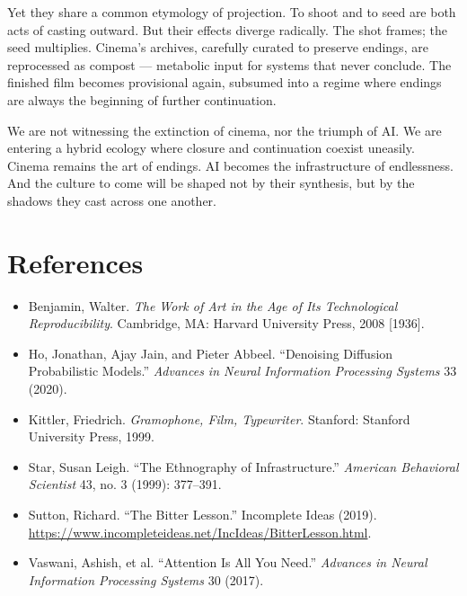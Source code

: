 \documentclass[11pt]{article}
\begin{document}
Yet they share a common etymology of projection. To shoot and to seed are both acts of casting outward. But their effects diverge radically. The shot frames; the seed multiplies. Cinema's archives, carefully curated to preserve endings, are reprocessed as compost --- metabolic input for systems that never conclude. The finished film becomes provisional again, subsumed into a regime where endings are always the beginning of further continuation.

We are not witnessing the extinction of cinema, nor the triumph of AI. We are entering a hybrid ecology where closure and continuation coexist uneasily. Cinema remains the art of endings. AI becomes the infrastructure of endlessness. And the culture to come will be shaped not by their synthesis, but by the shadows they cast across one another.

\vspace{1em}
\section*{References}
\begin{itemize}
  \item Benjamin, Walter. \textit{The Work of Art in the Age of Its Technological Reproducibility}. Cambridge, MA: Harvard University Press, 2008 [1936].
  \item Ho, Jonathan, Ajay Jain, and Pieter Abbeel. ``Denoising Diffusion Probabilistic Models.'' \textit{Advances in Neural Information Processing Systems} 33 (2020).
  \item Kittler, Friedrich. \textit{Gramophone, Film, Typewriter}. Stanford: Stanford University Press, 1999.
  \item Star, Susan Leigh. ``The Ethnography of Infrastructure.'' \textit{American Behavioral Scientist} 43, no. 3 (1999): 377--391.
  \item Sutton, Richard. ``The Bitter Lesson.'' Incomplete Ideas (2019). \url{https://www.incompleteideas.net/IncIdeas/BitterLesson.html}.
  \item Vaswani, Ashish, et al. ``Attention Is All You Need.'' \textit{Advances in Neural Information Processing Systems} 30 (2017).
\end{itemize}
\end{document}
